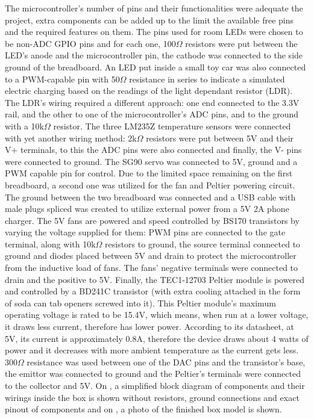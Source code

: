 The microcontroller's number of pins and their functionalities were adequate the project, extra components can be added up to the limit the available free pins and the required features on them. The pins used for room LEDs were chosen to be non-ADC GPIO pins and for each one, 100$\Omega$ resistors were put between the LED's anode and the microcontroller pin, the cathode was connected to the side ground of the breadboard. An LED put inside a small toy car was also connected to a PWM-capable pin with 50$\Omega$ resistance in series to indicate a simulated electric charging based on the readings of the light dependant resistor (LDR). The LDR's wiring required a different approach: one end connected to the 3.3V rail, and the other to one of the microcontroller's ADC pins, and to the ground with a 10k$\Omega$ resistor. The three LM235Z temperature sensors were connected with yet another wiring method: 2k$\Omega$ resistors were put between 5V and their V+ terminals, to this the ADC pins were also connected and finally, the V- pins were connected to ground. The SG90 servo was connected to 5V, ground and a PWM capable pin for control. Due to the limited space remaining on the first breadboard, a second one was utilized for the fan and Peltier powering circuit. The ground between the two breadboard was connected and a USB cable with male plugs spliced was created to utilize external power from a 5V 2A phone charger. The 5V fans are powered and speed controlled by BS170 transistors by varying the voltage supplied for them: PWM pins are connected to the gate terminal, along with 10k$\Omega$ resistors to ground, the source terminal connected to ground and diodes placed between 5V and drain to protect the microcontroller from the inductive load of fans. The fans' negative terminals were connected to drain and the positive to 5V. Finally, the TEC1-12703 Peltier module is powered and controlled by a BD241C transistor (with extra cooling attached in the form of soda can tab openers screwed into it). This Peltier module's maximum operating voltage is rated to be 15.4V, which means, when run at a lower voltage, it draws less current, therefore has lower power. According to its datasheet, at 5V, its current is approximately 0.8A, therefore the device draws about 4 watts of power and it decreases with more ambient temperature as the current gets less. \cite{PeltierDatasheet} 300$\Omega$ resistance was used between one of the DAC pins and the transistor's base, the emittor was connected to ground and the Peltier's terminals were connected to the collector and 5V. On , a simplified block diagram of components and their wirings inside the box is shown without resistors, ground connections and exact pinout of components and on , a photo of the finished box model is shown.

